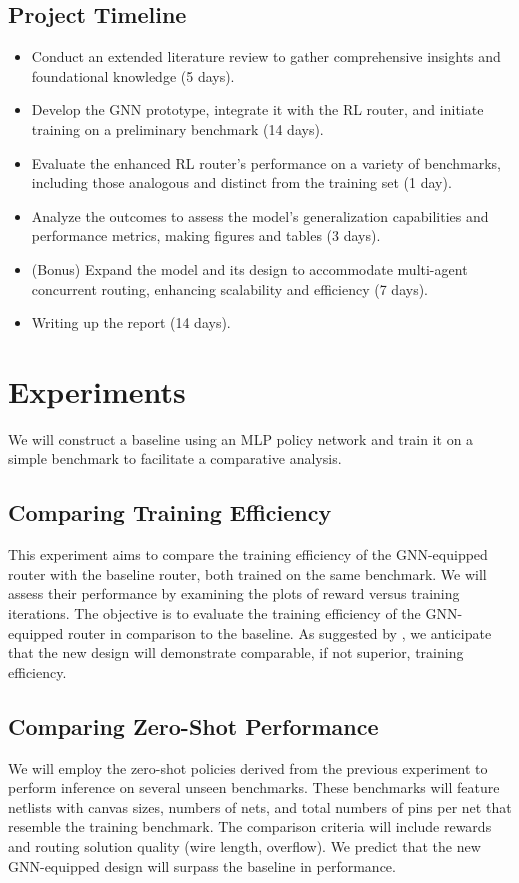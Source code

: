\documentclass[letterpaper]{article}
\begin{document}
\subsection{Project Timeline}
\begin{itemize}
    \item Conduct an extended literature review to gather comprehensive insights and foundational knowledge (5 days).
    \item Develop the GNN prototype, integrate it with the RL router, and initiate training on a preliminary benchmark (14 days).
    \item Evaluate the enhanced RL router’s performance on a variety of benchmarks, including those analogous and distinct from the training set (1 day).
    \item Analyze the outcomes to assess the model's generalization capabilities and performance metrics, making figures and tables (3 days).
    \item (Bonus) Expand the model and its design to accommodate multi-agent concurrent routing, enhancing scalability and efficiency (7 days).
    \item Writing up the report (14 days).
\end{itemize}

    
\section{Experiments}
We will construct a baseline using an MLP policy network and train it on a simple benchmark to facilitate a comparative analysis.

\subsection{Comparing Training Efficiency}
This experiment aims to compare the training efficiency of the GNN-equipped router with the baseline router, both trained on the same benchmark. We will assess their performance by examining the plots of reward versus training iterations. The objective is to evaluate the training efficiency of the GNN-equipped router in comparison to the baseline. As suggested by \cite{Wang2018}, we anticipate that the new design will demonstrate comparable, if not superior, training efficiency.

\subsection{Comparing Zero-Shot Performance} \label{m:0}
We will employ the zero-shot policies derived from the previous experiment to perform inference on several unseen benchmarks. These benchmarks will feature netlists with canvas sizes, numbers of nets, and total numbers of pins per net that resemble the training benchmark. The comparison criteria will include rewards and routing solution quality (wire length, overflow). We predict that the new GNN-equipped design will surpass the baseline in performance.
\end{document}

